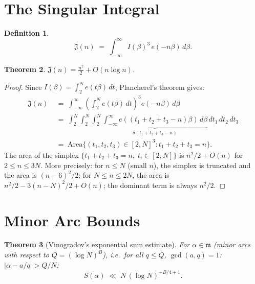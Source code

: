 \documentclass[12pt,a4paper]{amsart}
\newtheorem{theorem}{Theorem}[section]
\theoremstyle{definition}
\newtheorem{definition}[theorem]{Definition}
\newcommand{\eq}[1]{e\!\left(#1\right)}
\begin{document}
\section{The Singular Integral}
\label{sec:singint}

\begin{definition}
  \[
    \mathfrak{J}(n) \;=\; \int_{-\infty}^{\infty} I(\beta)^3\, \eq{-n\beta}\, d\beta.
  \]
\end{definition}

\begin{theorem}\label{thm:sing_int_prime}
  $\mathfrak{J}(n) = \frac{n^2}{2} + O(n \log n)$.
\end{theorem}

\begin{proof}
  Since $I(\beta) = \int_2^N \eq{t\beta}\, dt$, Plancherel's theorem gives:
  \begin{align*}
    \mathfrak{J}(n)
    &\;=\; \int_{-\infty}^{\infty}
           \left(\int_2^N \eq{t\beta}\, dt\right)^3 \eq{-n\beta}\, d\beta \\
    &\;=\; \int_2^N \int_2^N \int_2^N
           \underbrace{\int_{-\infty}^{\infty} \eq{(t_1+t_2+t_3-n)\beta}\, d\beta}%
           _{\delta(t_1+t_2+t_3-n)}\, dt_1\, dt_2\, dt_3 \\
    &\;=\; \text{Area}\bigl\{(t_1,t_2,t_3) \in [2,N]^3 : t_1+t_2+t_3 = n\bigr\}.
  \end{align*}
  The area of the simplex $\{t_1+t_2+t_3 = n,\; t_i \in [2,N]\}$ is
  $n^2/2 + O(n)$ for $2 \leq n \leq 3N$.  More precisely:
  for $n \leq N$ (small $n$), the simplex is truncated and the area
  is $(n-6)^2/2$; for $N \leq n \leq 2N$, the area is
  $n^2/2 - 3(n-N)^2/2 + O(n)$; the dominant term is always $n^2/2$.
\end{proof}

\section{Minor Arc Bounds}
\label{sec:minor}

\begin{theorem}[Vinogradov's exponential sum estimate]\label{thm:vinogradov_minor}
  For $\alpha \in \mathfrak{m}$ (minor arcs with respect to $Q = (\log N)^B$),
  i.e.\ for all $q \leq Q$, $\gcd(a,q)=1$: $|\alpha - a/q| > Q/N$:
  \[
    S(\alpha) \;\ll\; N\, (\log N)^{-B/4+1}.
  \]
\end{theorem}
\end{document}
